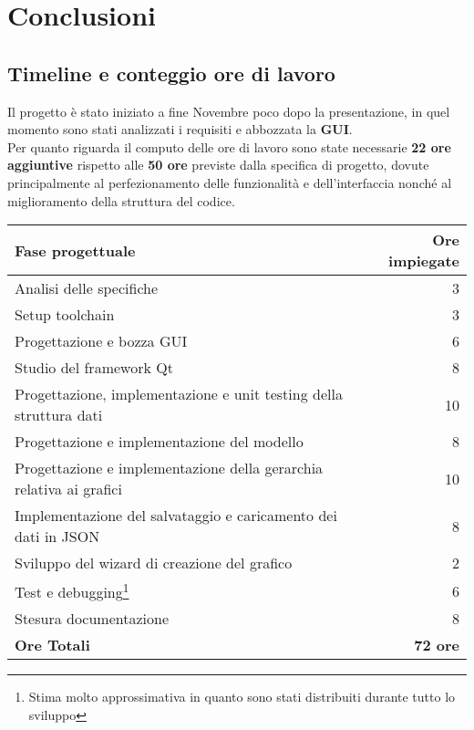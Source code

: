\section{Conclusioni}
\subsection{Timeline e conteggio ore di lavoro}
Il progetto è stato iniziato a fine Novembre poco dopo la presentazione, in quel momento sono stati analizzati i
requisiti e abbozzata la \textbf{GUI}.\\
Per quanto riguarda il computo delle ore di lavoro sono state necessarie \textbf{22 ore aggiuntive} rispetto alle
\textbf{50 ore} previste dalla specifica di progetto, dovute principalmente al perfezionamento delle funzionalità e
dell'interfaccia nonché al miglioramento della struttura del codice.\\

\begin{center}
    \begin{longtable}{ |l||r| }
        \hline
        \textbf{Fase progettuale} & \textbf{Ore impiegate} \\
        \hline
        Analisi delle specifiche & 3 \\
        Setup toolchain & 3 \\
        Progettazione e bozza GUI & 6 \\
        Studio del framework Qt & 8 \\
        Progettazione, implementazione e unit testing della struttura dati & 10 \\
        Progettazione e implementazione del modello & 8 \\
        Progettazione e implementazione della gerarchia relativa ai grafici & 10 \\
        Implementazione del salvataggio e caricamento dei dati in JSON & 8 \\
        Sviluppo del wizard di creazione del grafico & 2 \\
        Test e debugging\footnote{Stima molto approssimativa in quanto sono stati distribuiti durante tutto lo sviluppo}
            & 6 \\
        Stesura documentazione & 8 \\
        \hline
        \textbf{Ore Totali} & \textbf{72 ore} \\
        \hline
    \end{longtable}
\end{center}

